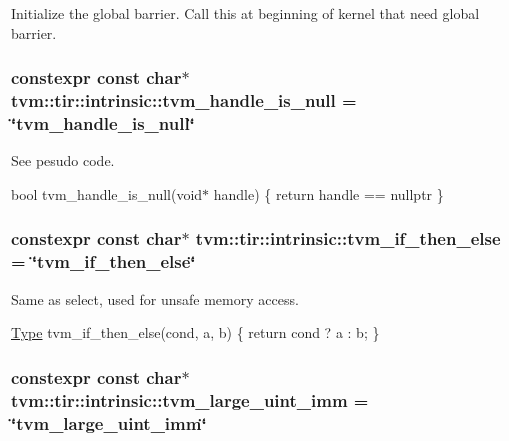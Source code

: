 Initialize the global barrier. Call this at beginning of kernel that need global barrier. 

\subsubsection[{\texorpdfstring{tvm\+\_\+handle\+\_\+is\+\_\+null}{tvm_handle_is_null}}]{\setlength{\rightskip}{0pt plus 5cm}constexpr const char$\ast$ tvm\+::tir\+::intrinsic\+::tvm\+\_\+handle\+\_\+is\+\_\+null = \char`\"{}tvm\+\_\+handle\+\_\+is\+\_\+null\char`\"{}}\hypertarget{namespacetvm_1_1tir_1_1intrinsic_ab5761917c5bd5b727203ddbc84763423}{}\label{namespacetvm_1_1tir_1_1intrinsic_ab5761917c5bd5b727203ddbc84763423}


See pesudo code. 

bool tvm\+\_\+handle\+\_\+is\+\_\+null(void$\ast$ handle) \{ return handle == nullptr \} 
\subsubsection[{\texorpdfstring{tvm\+\_\+if\+\_\+then\+\_\+else}{tvm_if_then_else}}]{\setlength{\rightskip}{0pt plus 5cm}constexpr const char$\ast$ tvm\+::tir\+::intrinsic\+::tvm\+\_\+if\+\_\+then\+\_\+else = \char`\"{}tvm\+\_\+if\+\_\+then\+\_\+else\char`\"{}}\hypertarget{namespacetvm_1_1tir_1_1intrinsic_acbd194e010059c3229f6db9809e77e5a}{}\label{namespacetvm_1_1tir_1_1intrinsic_acbd194e010059c3229f6db9809e77e5a}


Same as select, used for unsafe memory access. 

\hyperlink{classtvm_1_1Type}{Type} tvm\+\_\+if\+\_\+then\+\_\+else(cond, a, b) \{ return cond ? a \+: b; \} 
\subsubsection[{\texorpdfstring{tvm\+\_\+large\+\_\+uint\+\_\+imm}{tvm_large_uint_imm}}]{\setlength{\rightskip}{0pt plus 5cm}constexpr const char$\ast$ tvm\+::tir\+::intrinsic\+::tvm\+\_\+large\+\_\+uint\+\_\+imm = \char`\"{}tvm\+\_\+large\+\_\+uint\+\_\+imm\char`\"{}}\hypertarget{namespacetvm_1_1tir_1_1intrinsic_abdf19f5eab40c9dbc4952e76a29bd49c}{}\label{namespacetvm_1_1tir_1_1intrinsic_abdf19f5eab40c9dbc4952e76a29bd49c}


